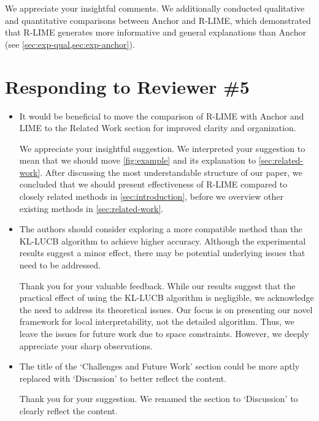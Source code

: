 \documentclass[runningheads]{llncs}
\begin{document}
\begin{mycomment}
  We appreciate your insightful comments.
  We additionally conducted qualitative and quantitative comparisons
  between Anchor and R-LIME,
  which demonstrated that R-LIME generates more informative and
  general explanations than Anchor (see \cref{sec:exp-qual,sec:exp-anchor}).
\end{mycomment}

\section*{Responding to Reviewer \#5}
\begin{itemize}
  \setlength{\itemsep}{15pt}
  \item It would be beneficial to move the comparison of R-LIME with Anchor
        and LIME to the Related Work section for improved clarity and
        organization.

        \begin{mycomment}
          We appreciate your insightful suggestion.
          We interpreted your suggestion to mean that we should move
          \cref{fig:example} and its explanation to \cref{sec:related-work}.
          After discussing the most understandable structure of our paper,
          we concluded that we should present effectiveness of R-LIME
          compared to closely related methods in \cref{sec:introduction},
          before we overview other existing methods in \cref{sec:related-work}.
        \end{mycomment}

  \item The authors should consider exploring a more compatible method than the
        KL-LUCB algorithm to achieve higher accuracy. Although the experimental
        results suggest a minor effect, there may be potential underlying issues
        that need to be addressed.

        \begin{mycomment}
          Thank you for your valuable feedback.
          While our results suggest that the practical effect of using
          the KL-LUCB algorithm is negligible,
          we acknowledge the need to address its theoretical issues.
          Our focus is on presenting our novel framework for local
          interpretability, not the detailed algorithm.
          Thus, we leave the issues for future work due to space constraints.
          However, we deeply appreciate your sharp observations.
        \end{mycomment}

  \item The title of the `Challenges and Future Work' section could be more
        aptly replaced with `Discussion' to better reflect the content.

        \begin{mycomment}
          Thank you for your suggestion. We renamed the section to `Discussion'
          to clearly reflect the content.
        \end{mycomment}
\end{itemize}
\end{document}
